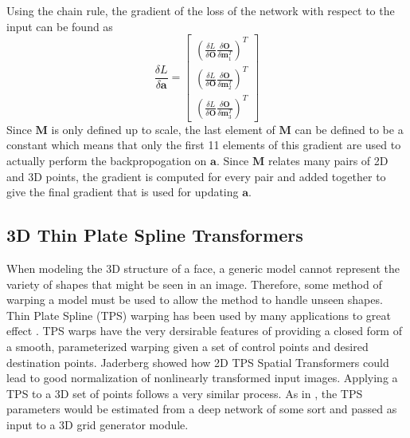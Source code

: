 \documentclass[10pt,twocolumn,letterpaper]{article}
\begin{document}
Using the chain rule, the gradient of the loss of the network with respect to the input can be found as
\begin{equation}
\frac{\delta L}{\delta\mathbf{a}}=
\begin{bmatrix}\left(\frac{\delta L}{\delta\mathbf{O}}\frac{\delta\mathbf{O}}{\delta \mathbf{m}_1^T}\right)^T\\ 
\left(\frac{\delta L}{\delta\mathbf{O}}\frac{\delta\mathbf{O}}{\delta \mathbf{m}_2^T}\right)^T\\
\left(\frac{\delta L}{\delta\mathbf{O}}\frac{\delta\mathbf{O}}{\delta \mathbf{m}_3^T}\right)^T\end{bmatrix}
\end{equation}
Since $\mathbf{M}$ is only defined up to scale, the last element of $\mathbf{M}$ can be defined to be a constant which means that only the first 11 elements of this gradient are used to actually perform the backpropogation on $\mathbf{a}$. Since $\mathbf{M}$ relates many pairs of 2D and 3D points, the gradient is computed for every pair and added together to give the final gradient that is used for updating $\mathbf{a}$.

\subsection{3D Thin Plate Spline Transformers}
\label{sec:TPS}
When modeling the 3D structure of a face, a generic model cannot represent the variety of shapes that might be seen in an image. Therefore, some method of warping a model must be used to allow the method to handle unseen shapes. Thin Plate Spline (TPS) warping has been used by many applications to great effect \cite{Bookstein89,Chui03}. TPS warps have the very dersirable features of providing a closed form of a smooth, parameterized warping given a set of control points and desired destination points. Jaderberg \etal \cite{Jaderberg15} showed how 2D TPS Spatial Transformers could lead to good normalization of nonlinearly transformed input images. Applying a TPS to a 3D set of points follows a very similar process. As in \cite{Jaderberg15}, the TPS parameters would be estimated from a deep network of some sort and passed as input to a 3D grid generator module.
\end{document}
